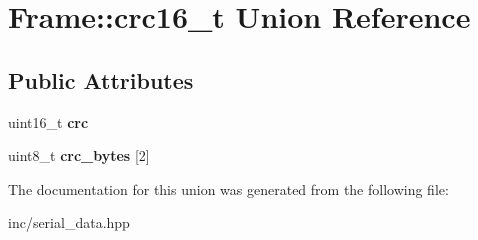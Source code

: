 \hypertarget{unionFrame_1_1crc16__t}{}\section{Frame\+:\+:crc16\+\_\+t Union Reference}
\label{unionFrame_1_1crc16__t}
\subsection*{Public Attributes}
\begin{DoxyCompactItemize}
\item 
\mbox{\label{unionFrame_1_1crc16__t_a230eea3ba9cb081e8e6d62bbf2a3f98f}} 
uint16\+\_\+t {\bfseries crc}
\item 
\mbox{\label{unionFrame_1_1crc16__t_ae785c01c5ae636921bbfc063c17d571f}} 
uint8\+\_\+t {\bfseries crc\+\_\+bytes} \mbox{[}2\mbox{]}
\end{DoxyCompactItemize}


The documentation for this union was generated from the following file\+:\begin{DoxyCompactItemize}
\item 
inc/serial\+\_\+data.\+hpp\end{DoxyCompactItemize}
